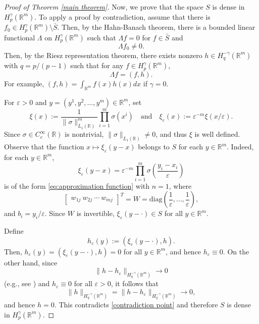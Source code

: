 \documentclass[11pt,reqno]{amsart}
\numberwithin{equation}{section}
\theoremstyle{remark}
\theoremstyle{definition}
\newcommand\bR{\mathbb{R}}
\newcommand\ep{\varepsilon}
\begin{document}
\begin{proof}[Proof of Theorem \ref{main theorem}]
Now, we prove that the space $S$ is dense in $H_p^\gamma(\bR^{m})$. To apply a proof by contradiction, assume that there is $f_0\in H_p^\gamma(\bR^{m})\setminus \bar S$. Then, by the Hahn-Banach theorem, there is a bounded linear functional $\Lambda$ on $H_p^\gamma(\bR^{m})$ such that $\Lambda f = 0$ for $f\in \bar S$ and 
\begin{equation}
\label{contradiction point}
\Lambda f_0\neq 0.
\end{equation}
Then, by the Riesz representation theorem, there exists nonzero $h\in H_q^{-\gamma}(\bR^{m})$ with $q = p/(p-1)$ such that for any $f\in H_p^\gamma(\bR^{m})$,
\begin{equation*}
\Lambda f = (f,h).
\end{equation*}
For example, $(f,h) = \int_{\bR^{m}} f(x)h(x) dx$ if $\gamma = 0$.


For $\ep>0$ and $y = (y^{1},y^{2},\dots,y^{m})\in\bR^{m}$, set
\begin{equation}
\label{mollifier}
\xi (x) := \frac{1}{\| \sigma \|_{L_1(\bR)}^{m}}\prod_{i = 1}^{m}\sigma(x^{i})\quad\text{and}\quad 
\xi_{\ep}(x) := \ep^{-m}\xi\left( x/\ep \right).
\end{equation}
Since $\sigma\in C_c^\infty(\bR)$ is nontrivial, $\| \sigma \|_{L_{1}(\bR)}\neq 0$, and thus $\xi$ is well defined. 
Observe that the function
$x\mapsto \xi_\varepsilon(y-x)$ belongs to $S$ for each $y\in\mathbb{R}^m$. Indeed, for each $y\in\mathbb{R}^m$,
\[
\xi_\varepsilon(y-x)
=\varepsilon^{-m}\prod_{i=1}^m \sigma\!\left(\frac{y_i-x_i}{\varepsilon}\right)
\]
is of the form \eqref{eq:approximation function} with $n=1$, where 
\[
\begin{bmatrix}
w_{1j}~w_{2j}~\cdots~w_{mj}
\end{bmatrix}^{T} = W =\mathrm{diag}\!\left(\frac1\varepsilon,\dots,\frac1\varepsilon\right),
\]
and $b_i=y_i/\varepsilon$. Since $W$ is invertible, $\xi_\varepsilon(y-\cdot)\in S$ for all $y\in\mathbb{R}^m$.


Define
\begin{equation*}
h_{\ep}(y) 
:= \left(\xi_{\ep}(y - \cdot),h\right).
\end{equation*}
Then, $h_\varepsilon(y)
=(\xi_\varepsilon(y-\cdot),h)=0$ for all $y\in\mathbb{R}^m$,
and hence $h_\varepsilon\equiv0$.
On the other hand, since 
\begin{equation}
\label{mollification}
\|h-h_\varepsilon\|_{H_q^{-\gamma}(\mathbb{R}^m)} \to 0
\end{equation}
(e.g., see \cite[Theorem 13.9.2]{krylov2024lectures}) and $h_\varepsilon\equiv0$ for all $\varepsilon>0$, it follows that
\[
\|h\|_{H_q^{-\gamma}(\mathbb{R}^m)}=\|h-h_\varepsilon\|_{H_q^{-\gamma}(\mathbb{R}^m)}\to0,
\]
and hence $h=0$.
This contradicts \eqref{contradiction point} and therefore $S$ is dense in
$H_p^\gamma(\mathbb{R}^m)$.



\end{proof}
\end{document}
